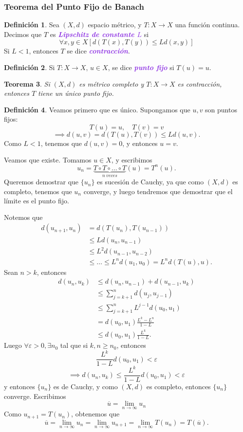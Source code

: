 \documentclass{article}
\newtheorem{theorem}{Teorema}[subsection]
\theoremstyle{definition}
\newtheorem{definition}[theorem]{Definición}
\theoremstyle{remark}
\numberwithin{equation}{section}
\newcommand{\e}{\varepsilon}
\newcommand{\oo}{\infty}
\renewcommand{\bar}{\overline}
\newcommand{\cor}[1]{\left[ #1 \right]}
\newcommand{\wea}[1]{\textcolor{BlueViolet}{\textbf{\emph{#1}}}}
\begin{document}
\newpage
\subsubsection{Teorema del Punto Fijo de Banach}

\begin{definition}
  Sea $(X,d)$ espacio métrico, y $T \colon X \to X$ una función continua. Decimos que $T$ es \wea{Lipschitz de constante $L$} si
  \[\forall x,y \in X \cor{d(T(x),T(y)) \leq L d(x,y)}\]
  Si $L < 1$, entonces $T$ se dice \wea{contracción}.
\end{definition}

\begin{definition}
  Si $T \colon X \to X$, $u \in X$, se dice \wea{punto fijo} si $T(u) = u$.
\end{definition}

\begin{theorem}
  Si $(X,d)$ es métrico completo y $T \colon X \to X$ es contracción, entonces $T$ tiene un único punto fijo.
\end{theorem}
\begin{definition}
  Veamos primero que es único. Supongamos que $u,v$ son puntos fijos:
  \[T(u) = u, \quad T(v) = v\]
  \[\implies d(u,v) = d(T(u),T(v)) \leq L d(u,v).\]
  Como $L<1$, tenemos que $d(u,v) = 0$, y entonces $u=v$.

  Veamos que existe. Tomamos $u \in X$, y escribimos
  \[u_n = \underbrace{T \circ T \circ \dots \circ T}_{n \ veces}(u) = T^n(u).\]
  Queremos demostrar que $\{u_n\}$ es sucesión de Cauchy, ya que como $(X,d)$ es completo, tenemos que $u_n$ converge, y luego tendremos que demostrar que el límite es el punto fijo.

  Notemos que
  \begin{align*}
    d(u_{n+1},u_n) &= d(T(u_n),T(u_{n-1})) \\
    &\leq L d(u_n, u_{n-1}) \\
    &\leq L^2 d(u_{n-1},u_{n-2}) \\
    &\leq \dots \leq L^n d(u_1,u_0)
    = L^n d(T(u),u).
  \end{align*}
  Sean $n>k$, entonces
  \begin{align*}
    d(u_n,u_k) &\leq d(u_n,u_{n-1}) + d(u_{n-1}, u_k) \\
    &\leq \sum_{j=k+1}^n d(u_j,u_{j-1}) \\
    &\leq \sum_{j=k+1}^n L^{j-1} d(u_0,u_1) \\
    &= d(u_0,u_1) \frac{L^k - L^n}{1-L} \\
    &\leq d(u_0,u_1) \frac{L^k}{1-L}.
  \end{align*}
  Luego $\forall \e>0, \exists n_0$ tal que si $k,n \geq n_0$, entonces
  \[\frac{L^k}{1-L} d(u_0,u_1) < \e\]
  \[\implies d(u_n,u_k) \leq \frac{L^k}{1-L} d(u_0,u_1) < \e\]
  y entonces $\{u_n\}$ es de Cauchy, y como $(X,d)$ es completo, entonces $\{u_n\}$ converge. Escribimos
  \[\bar u = \lim_{n\to\oo} u_n\]
  Como $u_{n+1} = T(u_n)$, obtenemos que
  \[\bar{u} = \lim_{n\to\oo} u_n = \lim_{n\to\oo} u_{n+1} = \lim_{n\to\oo} T(u_n) = T(\bar u).\]
\end{definition}
\end{document}
